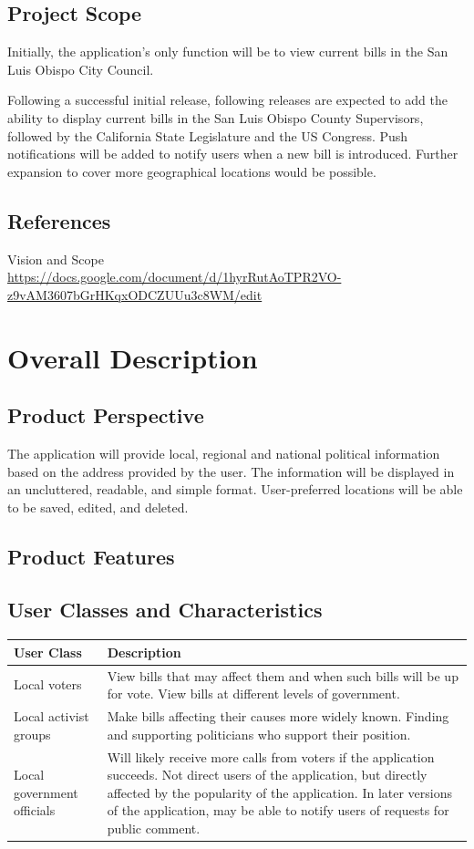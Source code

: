 \documentclass[12pt,oneside,letterpaper]{article}
\newcounter{use_case}
\begin{document}
\subsection{Project Scope}
Initially, the application's only function will be to view current
bills in the San Luis Obispo City Council.

Following a successful initial release, following releases are
expected to add the ability to display current bills in the San Luis
Obispo County Supervisors, followed by the California State
Legislature and the US Congress. Push notifications will be added to
notify users when a new bill is introduced. Further expansion to
cover more geographical locations would be possible.

\subsection{References}
\begin{compactenum}
\item Vision and Scope\\
  \url{https://docs.google.com/document/d/1hyrRutAoTPR2VO-z9vAM3607bGrHKqxODCZUUu3c8WM/edit}
\end{compactenum}

\section{Overall Description}
\subsection{Product Perspective}
The application will provide local, regional and national political
information based on the address provided by the user. The information
will be displayed in an uncluttered, readable, and simple format.
User-preferred locations will be able to be saved, edited, and deleted.

\subsection{Product Features}
\subsection{User Classes and Characteristics}
\begin{longtabu}{|l|X|}
  \hline
  \textbf{User Class}&\textbf{Description}\\
  \hline
  Local voters & View bills that may affect them and when such bills will be up for vote. View bills at different levels of government.\\
  \hline
  Local activist groups & Make bills affecting their causes more widely known. Finding and supporting politicians who support their position.\\
  \hline
  Local government officials & Will likely receive more calls from voters if the application succeeds. Not direct users of the application, but directly affected by the popularity of the application. In later versions of the application, may be able to notify users of requests for public comment.\\
  \hline
\end{longtabu}
\end{document}
